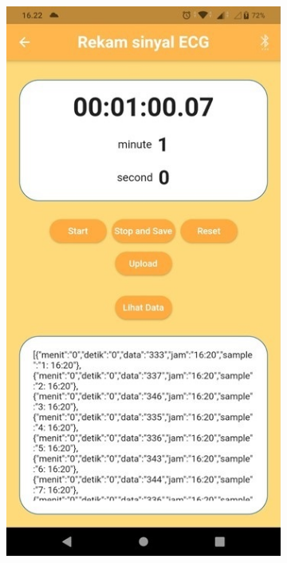 \begin{figure}[H] \centering
	\begin{subfigure}{0.45\textwidth}
		\centering
		\includegraphics[width=1\linewidth]{img/percob/Slide12a}	  
		\caption{}		
	\end{subfigure}

\end{figure}
